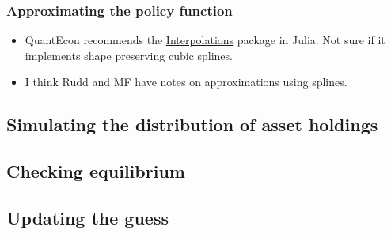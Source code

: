\documentclass[12pt]{article}
\begin{document}
\iffalse
\begin{itemize}
\item What I really need to try to understanding is EGM. QuantEcon has one \href{https://lectures.quantecon.org/jl/egm_policy_iter.html}{lecture} on it, but not sure if it's super useful. Here are some other useful \href{https://www.cemfi.es/~pijoan/Teaching_files/Notes%20on%20endogenous%20grid%20method.pdf}{notes}.
\end{itemize}
\fi


\subsubsection{Approximating the policy function}
\begin{itemize}
\item QuantEcon recommends the \href{https://github.com/JuliaMath/Interpolations.jl}{Interpolations} package in Julia. Not sure if it implements shape preserving cubic splines.
\item I think Rudd and MF have notes on approximations using splines.
\end{itemize}



\subsection{Simulating the distribution of asset holdings}

\subsection{Checking equilibrium}

\subsection{Updating the guess}
\end{document}
